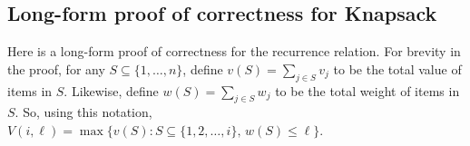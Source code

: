 

  


\continued

\subsection*{Long-form proof of correctness for Knapsack}



Here is a long-form proof of correctness for the recurrence relation.
For brevity in the proof, for any $S\subseteq \{1,\ldots,n\}$,
define $v(S) = \sum_{j\in S} v_j$ to be the total value of items in $S$.
Likewise, define $w(S) = \sum_{j\in S} w_j$ to be  the total weight of items in $S$.
So, using this notation,
$V(i, \ell) = \max\big\{ v(S) : S\subseteq \{1,2,\ldots,i\},\,w(S) \le \ell\big\}$.

